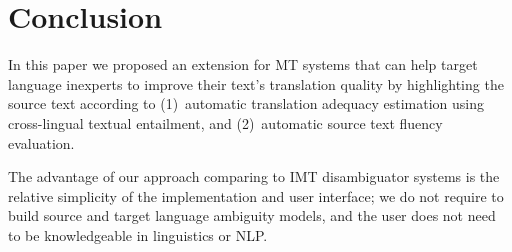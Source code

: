 \documentclass[hidelinks,10pt,letter]{article} %
\begin{document}
    
    \section{Conclusion}\label{sec:concl}
    In this paper we proposed an extension for MT systems that can help target language inexperts to improve their text's translation quality
    by highlighting the source text according to (1)~automatic translation adequacy estimation using cross-lingual textual entailment,
    and (2)~automatic source text fluency evaluation.
    
    The advantage of our approach comparing to IMT disambiguator systems is the relative simplicity of the implementation and user interface;
    we do not require to build source and target language ambiguity models, and the user does not need to be knowledgeable in linguistics
    or NLP.
    
    \nocite{*}
%    
    
    
\end{document}
